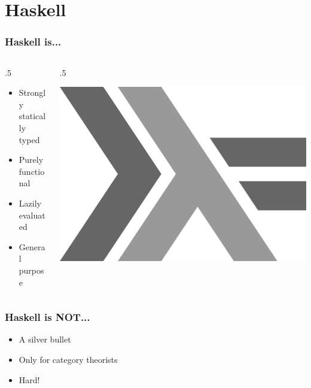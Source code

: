 \documentclass[17pt]{beamer}
\renewcommand{\(}[1]{\begin{columns}[#1]}
\renewcommand{\)}{\end{columns}}
\newcommand{\<}[1]{\begin{column}{#1}}
\renewcommand{\>}{\end{column}}
\begin{document}
\section{Haskell}

\begin{frame}
  \frametitle{Haskell is...}
  \({c}
  \<{.5\textwidth}
  \begin{center}
    \begin{itemize}
    \item Strongly statically typed
    \item Purely functional
    \item Lazily evaluated
    \item General purpose
    \end{itemize}
  \end{center}
  \>
  \<{.5\textwidth}
  \begin{center}
    \includegraphics[width=.5\textwidth]{img/haskell-logo}
  \end{center}
  \>
  \)
\end{frame}

\begin{frame}
  \frametitle{Haskell is NOT...}
  \begin{center}
    \begin{itemize}
    \item A silver bullet
    \item Only for category theorists
    \item<2-> Hard! 
    \end{itemize}
  \end{center}
\end{frame}
\end{document}
